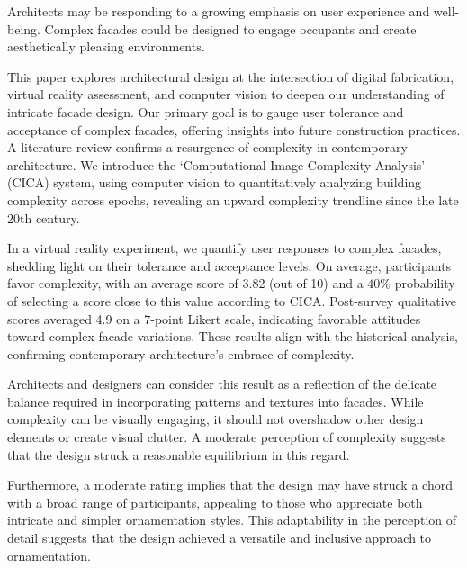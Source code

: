 

 Architects may be responding to a growing emphasis on user experience and well-being.
 Complex facades could be designed to engage occupants and create aesthetically pleasing environments.

This paper explores architectural design at the intersection of digital fabrication, virtual reality assessment, and computer vision to deepen our understanding of intricate facade design.
Our primary goal is to gauge user tolerance and acceptance of complex facades, offering insights into future construction practices.
A literature review confirms a resurgence of complexity in contemporary architecture.
We introduce the `Computational Image Complexity Analysis' (CICA) system, using computer vision to quantitatively analyzing building complexity across epochs, revealing an upward complexity trendline since the late 20th century.

In a virtual reality experiment, we quantify user responses to complex facades, shedding light on their tolerance and acceptance levels.
On average, participants favor complexity, with an average score of 3.82 (out of 10) and a \(40\%\) probability of selecting a score close to this value according to CICA.
Post-survey qualitative scores averaged 4.9 on a 7-point Likert scale, indicating favorable attitudes toward complex facade variations.
These results align with the historical analysis, confirming contemporary architecture's embrace of complexity.

 Architects and designers can consider this result as a reflection of the delicate balance required in incorporating patterns and textures into facades.
 While complexity can be visually engaging, it should not overshadow other design elements or create visual clutter.
 A moderate perception of complexity suggests that the design struck a reasonable equilibrium in this regard.


Furthermore, a moderate rating implies that the design may have struck a chord with a broad range of participants, appealing to those who appreciate both intricate and simpler ornamentation styles.
 This adaptability in the perception of detail suggests that the design achieved a versatile and inclusive approach to ornamentation.

